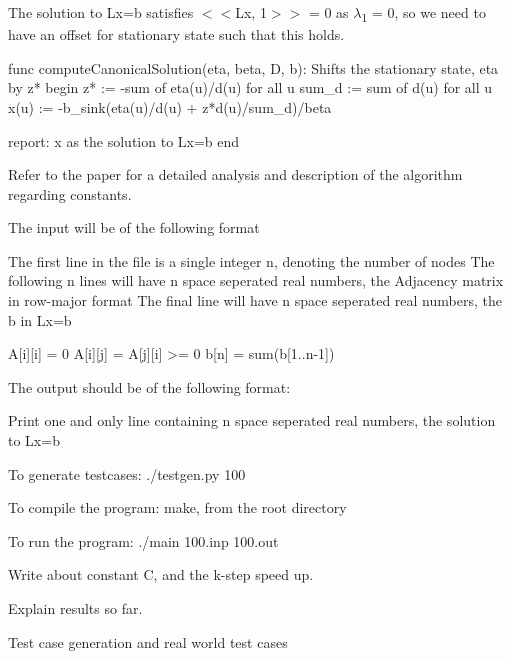 The solution to Lx=b satisfies $<$$<$Lx, 1$>$$>$ = 0 as {$\lambda$}\textsubscript{1} = 0, so we need to have an offset for stationary state such that this holds.


\begin{DoxyCode}
func computeCanonicalSolution(eta, beta, D, b):
    Shifts the stationary state, eta by z*
begin
    z* := -sum of eta(u)/d(u) for all u
    sum\_d := sum of d(u) for all u
    x(u) := -b\_sink(eta(u)/d(u) + z*d(u)/sum\_d)/beta

    report: x as the solution to Lx=b
end
\end{DoxyCode}



\begin{DoxyItemize}
\item Refer to the paper for a detailed analysis and description of the algorithm regarding constants.
\end{DoxyItemize}

The input will be of the following format


\begin{DoxyCode}
The first line in the file is a single integer n, denoting the number of nodes
The following n lines will have n space seperated real numbers, the Adjacency
matrix in row-major format
The final line will have n space seperated real numbers, the b in Lx=b

A[i][i] = 0
A[i][j] = A[j][i] >= 0
b[n] = sum(b[1..n-1])
\end{DoxyCode}


The output should be of the following format\+:


\begin{DoxyCode}
Print one and only line containing n space seperated real numbers, the solution
to Lx=b
\end{DoxyCode}



\begin{DoxyItemize}
\item To generate testcases\+: {\ttfamily ./testgen.py 100}
\item To compile the program\+: {\ttfamily make}, from the root directory
\item To run the program\+: {\ttfamily ./main 100.\+inp 100.\+out} 


\end{DoxyItemize}


\begin{DoxyItemize}
\item Write about constant C, and the k-\/step speed up.
\item Explain results so far.
\item Test case generation and real world test cases 
\end{DoxyItemize}
